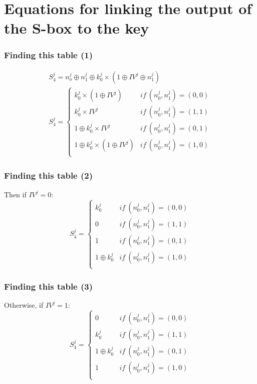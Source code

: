 \documentclass{beamer}
\begin{document}
	
	\section{Equations for linking the output of the S-box to the key}
	\begin{frame}
		\frametitle{Finding this table (1)}
		\begin{gather*}
			S_4^j = n_o^j \oplus n_1^j \oplus k_0^j \times (1 \oplus IV^j \oplus n_1^j)\\
			S _4^j =\left \{	
			\begin{array}{ll}
				k_0^j \times (1 \oplus IV^j) & if\ (n_0^j,n_1^j)=(0,0)\\
				k_0^j \times IV^j & if\ (n_0^j,n_1^j)=(1,1)\\
				1 \oplus k_0^j \times IV^j & if\ (n_0^j,n_1^j)=(0,1)\\
				1 \oplus k_0^j \times (1 \oplus IV^j) & if\ (n_0^j,n_1^j)=(1,0)\\
			\end{array}
			\right.
		\end{gather*}
	\end{frame}
	
	\begin{frame}
		\frametitle{Finding this table (2)}
		\noindent Then if $IV^j = 0$: 
		$$S _4^j =\left \{	
		\begin{array}{ll}
			k_0^j& if\ (n_0^j,n_1^j)=(0,0)\\
			0& if\ (n_0^j,n_1^j)=(1,1)\\
			1& if\ (n_0^j,n_1^j)=(0,1)\\
			1 \oplus k_0^j& if\ (n_0^j,n_1^j)=(1,0)\\
		\end{array}
		\right.$$
	\end{frame}
	
	\begin{frame}
		\frametitle{Finding this table (3)}
		\noindent Otherwise, if $IV^j = 1$:
		$$S _4^j =\left \{	
		\begin{array}{ll}
			0& if\ (n_0^j,n_1^j)=(0,0)\\
			k_0^j& if\ (n_0^j,n_1^j)=(1,1)\\
			1 \oplus k_0^j& if\ (n_0^j,n_1^j)=(0,1)\\
			1& if\ (n_0^j,n_1^j)=(1,0)\\
		\end{array}
		\right.$$
	\end{frame}
	
\end{document}

